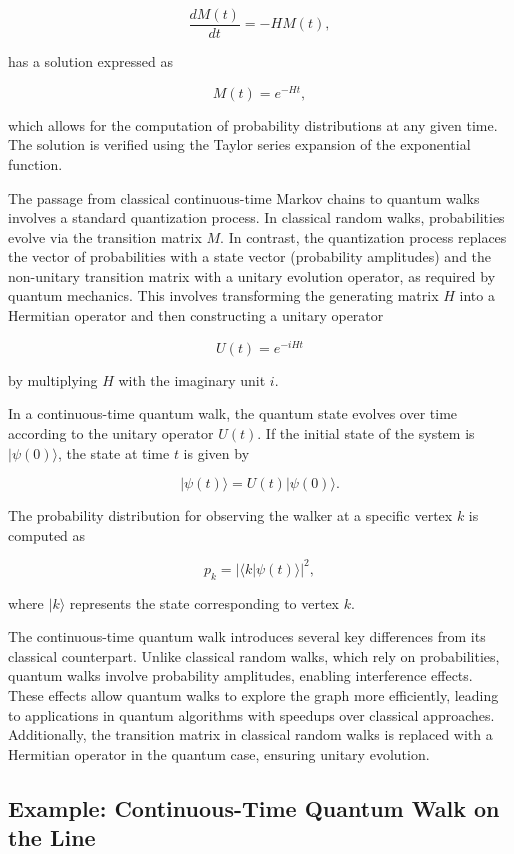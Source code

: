 \documentclass[11pt]{article}
\theoremstyle{definition}
\begin{document}
\[
\frac{dM(t)}{dt} = -H M(t),
\]

has a solution expressed as 

\[
M(t) = e^{-Ht},
\]

which allows for the computation of probability distributions at any given time. The solution is verified using the Taylor series expansion of the exponential function.

The passage from classical continuous-time Markov chains to quantum walks involves a standard quantization process. In classical random walks, probabilities evolve via the transition matrix \( M \). In contrast, the quantization process replaces the vector of probabilities with a state vector (probability amplitudes) and the non-unitary transition matrix with a unitary evolution operator, as required by quantum mechanics. This involves transforming the generating matrix \( H \) into a Hermitian operator and then constructing a unitary operator 

\[
U(t) = e^{-iHt}
\]

by multiplying \( H \) with the imaginary unit \( i \).

In a continuous-time quantum walk, the quantum state evolves over time according to the unitary operator \( U(t) \). If the initial state of the system is \( |\psi(0)\rangle \), the state at time \( t \) is given by 

\[
|\psi(t)\rangle = U(t) |\psi(0)\rangle.
\]

The probability distribution for observing the walker at a specific vertex \( k \) is computed as 

\[
p_k = |\langle k | \psi(t) \rangle|^2,
\]

where \( |k\rangle \) represents the state corresponding to vertex \( k \).

The continuous-time quantum walk introduces several key differences from its classical counterpart. Unlike classical random walks, which rely on probabilities, quantum walks involve probability amplitudes, enabling interference effects. These effects allow quantum walks to explore the graph more efficiently, leading to applications in quantum algorithms with speedups over classical approaches. Additionally, the transition matrix in classical random walks is replaced with a Hermitian operator in the quantum case, ensuring unitary evolution.



\subsection*{Example: Continuous-Time Quantum Walk on the Line}
\end{document}
